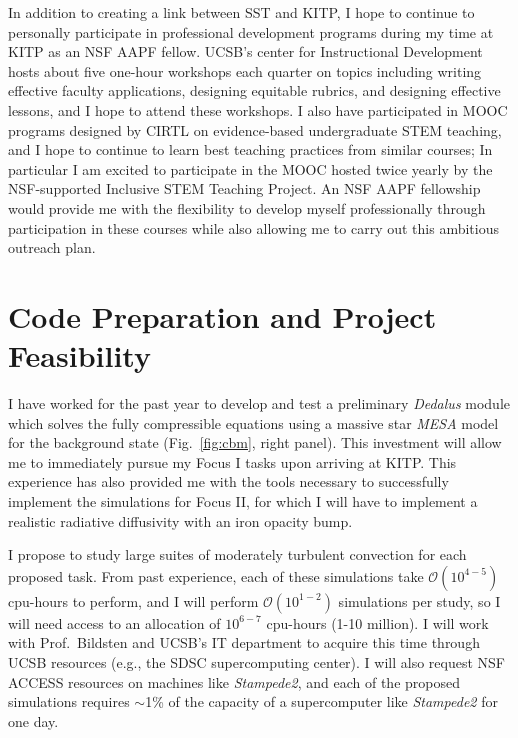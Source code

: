 \documentclass[11pt]{amsart} %
\theoremstyle{definition}
\numberwithin{equation}{section}
\begin{document}
In addition to creating a link between SST and KITP, I hope to continue to personally participate in professional development programs during my time at KITP as an NSF AAPF fellow.
UCSB's center for Instructional Development hosts about five one-hour workshops each quarter on topics including writing effective faculty applications, designing equitable rubrics, and designing effective lessons, and I hope to attend these workshops.
I also have participated in MOOC programs designed by CIRTL on evidence-based undergraduate STEM teaching, and I hope to continue to learn best teaching practices from similar courses; In particular I am excited to participate in the MOOC hosted twice yearly by the NSF-supported Inclusive STEM Teaching Project.
An NSF AAPF fellowship would provide me with the flexibility to develop myself professionally through participation in these courses while also allowing me to carry out this ambitious outreach plan.


\section{Code Preparation and Project Feasibility}

I have worked for the past year to develop and test a preliminary \emph{Dedalus} module which solves the fully compressible equations using a massive star \emph{MESA} model for the background state (Fig.~\ref{fig:cbm}, right panel).
This investment will allow me to immediately pursue my Focus I tasks upon arriving at KITP.
This experience has also provided me with the tools necessary to successfully implement the simulations for Focus II, for which I will have to implement a realistic radiative diffusivity with an iron opacity bump.

I propose to study large suites of moderately turbulent convection for each proposed task.
From past experience, each of these simulations take $\mathcal{O}(10^{4-5})$ cpu-hours to perform, and I will perform $\mathcal{O}(10^{1-2})$ simulations per study, so I will need access to an allocation of $10^{6-7}$ cpu-hours (1-10 million).
I will work with Prof.~Bildsten and UCSB's IT department to acquire this time through UCSB resources (e.g., the SDSC supercomputing center).
I will also request NSF ACCESS resources on machines like \emph{Stampede2}, and each of the proposed simulations requires $\sim$1\% of the capacity of a supercomputer like \emph{Stampede2} for one day. 
\end{document}
